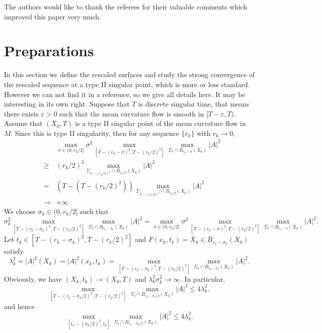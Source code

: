 The authors would like to thank the referees for their valuable
comments which improved this paper very much.
\section{Preparations}

In this section we define the rescaled surfaces and study the
strong convergence of the rescaled sequence at a type II singular
point, which is more or less standard. However we can not find it
in a reference, so we give all details here. It may be interesting
in its own right. Suppose that $T$ is discrete singular time, that
means there exists $\varepsilon>0$ such that the mean curvature
flow is smooth in $[T-\varepsilon, T)$. Assume that $(X_0, T)$ is
a type II singular point of the mean curvature flow in $M$. Since
this is type II singularity, then for any sequence $\{r_k\}$ with
$r_k\to 0$,
\begin{eqnarray*}&&\max_{\sigma\in (0, r_k/2]}\sigma^2 \max_{[T-(r_k-\sigma)^2,
T-(r_k/2)^2]} \max_{\Sigma_t\cap B_{r_k-\sigma}(X_0)}|A|^2\\
&\geq& (r_k/2)^2\max_{\Sigma_{T-(r_k/2)^2}\cap B_{r_k/2}(X_0)}|A|^2\\
&=&(T-(T-(r_k/2)^2))\max_{\Sigma_{T-(r_k/2)^2}\cap
B_{r_k/2}(X_0)}|A|^2\\ &\rightarrow& +\infty
\end{eqnarray*}
We choose $\sigma_k\in (0, r_k/2]$ such that
$$\sigma_k^2 \max_{[T-(r_k-\sigma_k)^2, T-(r_k/2)^2]}
\max_{\Sigma_t\cap B_{r_k-\sigma_k}(X_0)}|A|^2=\max_{\sigma\in (0,
r_k/2]}\sigma^2 \max_{[T-(r_k-\sigma)^2, T-(r_k/2)^2]}
\max_{\Sigma_t\cap B_{r_k-\sigma}(X_0)}|A|^2.
$$
Let $t_k\in [T-(r_k-\sigma_k)^2, T-(r_k/2)^2]$ and
$F(x_k,t_k)=X_k\in\bar{B}_{r_k-\sigma_k}(X_0)$ satisfy
$$\lambda_k^2=|A|^2(X_k)=|A|^2(x_k, t_k)=\max_{[T-(r_k-\sigma_k)^2, T-(r_k/2)^2]}
\max_{\Sigma_t\cap B_{r_k-\sigma_k}(X_0)}|A|^2.$$ Obviously, we
have $(X_k, t_k)\to (X_0, T)$ and
$\lambda_k^2\sigma_k^2\to\infty$. In particular,
\begin{equation}\label{e0.2} \max_{[T-(r_k-\sigma_k/2)^2, T-(r_k/2)^2]} \max_{\Sigma_t\cap
B_{r_k-\sigma_k/2}(X_0)}|A|^2\leq 4\lambda_k^2, \end{equation} and
hence \begin{equation}\label{e0.3}\max_{[t_k-(\sigma_k/2)^2, t_k]}
\max_{\Sigma_t\cap B_{r_k-\sigma_k/2}(X_0)}|A|^2\leq 4\lambda_k^2.
\end{equation}

